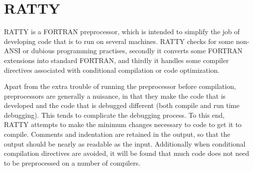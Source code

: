 \section{RATTY}
RATTY is a FORTRAN preprocessor, which is intended to simplify the job of
developing code that is to run on several machines.
RATTY checks for some non-ANSI or dubious programming
practises, secondly it converts some FORTRAN extensions into standard
FORTRAN, and thirdly it handles some compiler directives associated with
conditional compilation or code optimization.

Apart from the
extra trouble of running the preprocessor before compilation,  preprocessors
are generally a nuisance, in that they make the code that is developed
and the code that is debugged different (both compile and run time debugging).
This tends to complicate the debugging process. To this end, RATTY
attempts to make the minimum changes necessary to code to get it to compile.
Comments and indentation are retained in the output, so that the output
should
be nearly as readable as the input. Additionally when 
conditional compilation directives are avoided, it will be found that much
code does not need to be preprocessed on a number of compilers.

